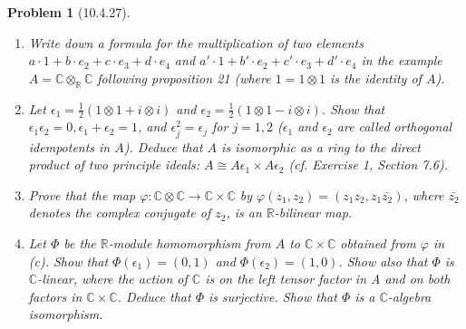 \documentclass[10pt]{article}
\newcommand{\bb}[1]{\mathbb{#1}}
\theoremstyle{plain}
\newtheorem{problem}{Problem}
\theoremstyle{remark}
\begin{document}
\begin{problem}[10.4.27]
  \begin{enumerate}
  \item[(a)] Write down a formula for the multiplication of two elements
    $a\cdot 1+b\cdot e_2+c\cdot e_3+d\cdot e_4$ and
    $a'\cdot 1+b'\cdot e_2+c'\cdot e_3+d'\cdot e_4$ in the example
    $A=\bb{C}\otimes_{\bb{R}}\bb{C}$ following proposition 21
    (where $1=1\otimes 1$ is the identity of $A$).
  \item[(b)] Let $\epsilon_1=\frac{1}{2}(1\otimes 1+i\otimes i)$ and
    $\epsilon_2=\frac{1}{2}(1\otimes 1-i\otimes i)$. Show that
    $\epsilon_1\epsilon_2=0,\epsilon_1+\epsilon_2=1$, and
    $\epsilon_j^2=\epsilon_j$ for $j=1,2$ ($\epsilon_1$ and $\epsilon_2$ are
    called orthogonal idempotents in $A$). Deduce that $A$ is isomorphic
    as a ring to the direct product of two principle ideals:
    $A\cong A\epsilon_1\times A\epsilon_2$ (cf. Exercise 1, Section 7.6).
  \item[(c)] Prove that the map
    $\varphi:\bb{C}\otimes\bb{C}\rightarrow\bb{C}\times\bb{C}$ by
    $\varphi(z_1,z_2)=(z_1z_2,z_1\bar{z_2})$, where $\bar{z_2}$
    denotes the complex conjugate of $z_2$, is an $\bb{R}$-bilinear map.
  \item[(d)] Let $\Phi$ be the $\bb{R}$-module homomorphism from $A$ to
    $\bb{C}\times\bb{C}$ obtained from $\varphi$ in (c). Show that
    $\Phi(\epsilon_1)=(0,1)$ and $\Phi(\epsilon_2)=(1,0)$. Show also that $\Phi$
    is $\bb{C}$-linear, where the action of $\bb{C}$ is on the left tensor
    factor in A and on both factors in $\bb{C}\times\bb{C}$. Deduce that
    $\Phi$ is surjective. Show that $\Phi$ is a $\bb{C}$-algebra isomorphism.
  \end{enumerate}
\end{problem}
\end{document}
